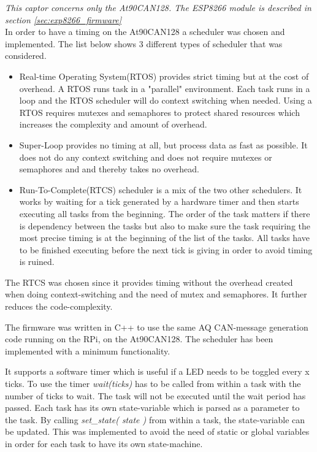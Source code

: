 \textit{This captor concerns only the At90CAN128.  The ESP8266 module is described in section \ref{sec:exp8266_firmware}} \\
In order to have a timing on the At90CAN128 a scheduler was chosen and implemented.
The list below shows 3 different types of scheduler that was considered.
\begin{itemize}
	\item Real-time Operating System(RTOS) provides strict timing but at the cost of overhead. A RTOS runs task in a "parallel" environment. Each task runs in a loop and the RTOS scheduler will do context switching when needed. Using a RTOS requires mutexes and semaphores to protect shared resources which increases the complexity and amount of overhead.
	\item Super-Loop provides no timing at all, but process data as fast as possible. It does not do any context switching and does not require mutexes or semaphores and  and thereby takes no overhead.
	\item Run-To-Complete(RTCS) scheduler is a mix of the two other schedulers. It works by waiting for a tick generated by a hardware timer and then starts executing all tasks from the beginning. The order of the task matters if there is dependency between the tasks but also to make sure the task requiring the most precise timing is at the beginning of the list of the tasks. All tasks have to be finished executing before the next tick is giving in order to avoid timing is ruined.
\end{itemize}
The RTCS was chosen since it provides timing without the overhead created when doing context-switching and the need of mutex and semaphores. It further reduces the code-complexity.

The firmware was written in C++ to use the same \ac{AQ} CAN-message generation code running on the \ac{RPi}, on the At90CAN128.
The scheduler has been implemented with a minimum functionality.

It supports a software timer which is useful if a \ac{LED} needs to be toggled every x ticks. To use the timer  \textit{wait(ticks)} has to be called from within a task with the number of ticks to wait.
The task will not be executed until the wait period has passed. Each task has its own state-variable which is parsed as a parameter to the task. By calling \textit{set\_state( state )} from within a task, the state-variable can be updated. This was implemented to avoid the need of static or global variables in order for each task to have its own state-machine.

